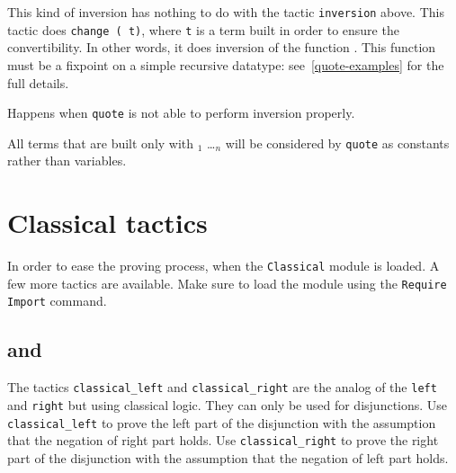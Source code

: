 This kind of inversion has nothing to do with the tactic
\texttt{inversion} above. This tactic does \texttt{change (\ident\
  t)}, where \texttt{t} is a term built in order to ensure the
convertibility. In other words, it does inversion of the function
\ident. This function must be a fixpoint on a simple recursive
datatype: see~\ref{quote-examples} for the full details.

\begin{ErrMsgs}
\item {}

  Happens when \texttt{quote} is not able to perform inversion properly.
\end{ErrMsgs}

\begin{Variants}
\item {}

  All terms that are built only with \ident$_1$ \dots \ident$_n$ will be
  considered by \texttt{quote} as constants rather than variables.
\end{Variants}


\section{Classical tactics}
\label{ClassicalTactics}

In order to ease the proving process, when the {\tt Classical} module is loaded. A few more tactics are available. Make sure to load the module using the \texttt{Require Import} command.

\subsection{{} and {}}
\tacindex{classical\_left}

The tactics \texttt{classical\_left} and \texttt{classical\_right} are the analog of the \texttt{left} and \texttt{right} but using classical logic. They can only be used for disjunctions.
Use  \texttt{classical\_left} to prove the left part of the disjunction with the assumption that the negation of right part holds.
Use \texttt{classical\_right} to prove the right part of the disjunction with the assumption that the negation of left part holds.

